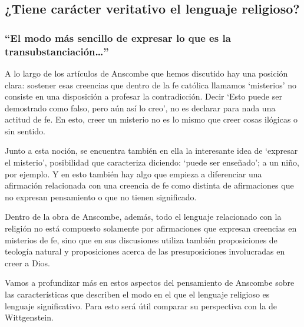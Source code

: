 \subsection{¿Tiene carácter veritativo el lenguaje religioso?}

\subsubsection{\enquote{El modo más sencillo de expresar lo que es la transubstanciación\ldots}}

A lo largo de los artículos de Anscombe que hemos discutido hay una posición clara: sostener esas creencias que dentro de la fe católica llamamos `misterios' no consiste en una disposición a profesar la contradicción. Decir \enquote*{Esto puede ser demostrado como falso, pero aún así lo creo}, no es declarar para nada una actitud de fe. En esto, creer un misterio no es lo mismo que creer cosas ilógicas o sin sentido.

Junto a esta noción, se encuentra también en ella la interesante idea de \enquote*{expresar el misterio}, posibilidad que caracteriza diciendo: \enquote*{puede ser enseñado}; a un niño, por ejemplo. Y en esto también hay algo que empieza a diferenciar una afirmación relacionada con una creencia de fe como distinta de afirmaciones que no expresan pensamiento o que no tienen significado.

Dentro de la obra de Anscombe, además, todo el lenguaje relacionado con la religión no está compuesto solamente por afirmaciones que expresan creencias en misterios de fe, sino que en sus discusiones utiliza también proposiciones de teología natural y proposiciones acerca de las presuposiciones involucradas en creer a Dios.

Vamos a profundizar más en estos aspectos del pensamiento de Anscombe sobre las características que describen el modo en el que el lenguaje religioso es lenguaje significativo. Para esto será útil comparar su perspectiva con la de Wittgenstein.

